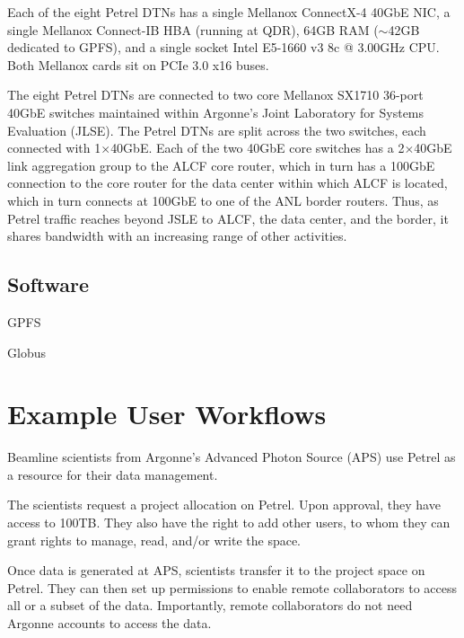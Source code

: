 \documentclass[sigconf]{acmart}
\begin{document}
Each of the eight Petrel DTNs has a single Mellanox ConnectX-4 40GbE NIC, a single Mellanox Connect-IB HBA (running at QDR), 64GB RAM ($\sim$42GB dedicated to GPFS), and a single socket Intel E5-1660 v3 8c @ 3.00GHz CPU. 
Both Mellanox cards sit on PCIe 3.0 x16 buses.

The eight Petrel DTNs are connected to two core Mellanox SX1710 36-port 40GbE switches
maintained within Argonne's Joint Laboratory for Systems Evaluation (JLSE).
The Petrel DTNs are split across the two switches, each connected with 1$\times$40GbE. 
Each of the two 40GbE core switches has a 2$\times$40GbE link aggregation group to the ALCF core router, which in turn has a 100GbE connection to the core router for the data center within
which ALCF is located,
which in turn connects at 100GbE to one of the ANL border routers.
Thus, as Petrel traffic reaches beyond JSLE to ALCF, the data center, and the border,
it shares bandwidth with an increasing range of other activities.

\subsection{Software}

GPFS 

Globus




\section{Example User Workflows}


Beamline scientists from Argonne's Advanced Photon Source (APS) use Petrel as a resource for their data management.

The scientists request a project allocation on Petrel. 
Upon approval, they have access to 100TB. 
They also have the right to add other users, to whom they can grant rights to manage, read, and/or write the space.

Once data is generated at APS, scientists transfer it to the project space on Petrel. 
They can then set up permissions to enable remote collaborators to access all or a subset of the data. 
Importantly, remote collaborators do not need Argonne accounts to access the data.
\end{document}
